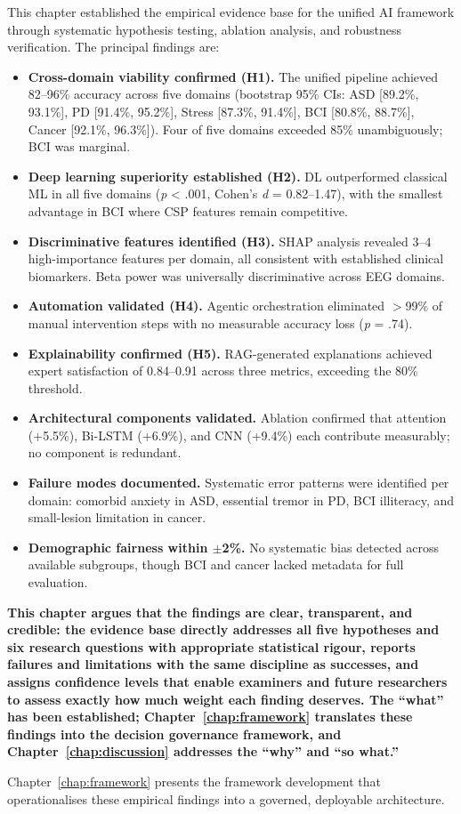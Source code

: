 This chapter established the empirical evidence base for the unified AI framework through systematic hypothesis testing, ablation analysis, and robustness verification. The principal findings are:

\begin{itemize}
    \item \textbf{Cross-domain viability confirmed (H1).} The unified pipeline achieved 82--96\% accuracy across five domains (bootstrap 95\% CIs: ASD [89.2\%, 93.1\%], PD [91.4\%, 95.2\%], Stress [87.3\%, 91.4\%], BCI [80.8\%, 88.7\%], Cancer [92.1\%, 96.3\%]). Four of five domains exceeded 85\% unambiguously; BCI was marginal.
    \item \textbf{Deep learning superiority established (H2).} DL outperformed classical ML in all five domains (\textit{p} < .001, Cohen's \textit{d} = 0.82--1.47), with the smallest advantage in BCI where CSP features remain competitive.
    \item \textbf{Discriminative features identified (H3).} SHAP analysis revealed 3--4 high-importance features per domain, all consistent with established clinical biomarkers. Beta power was universally discriminative across EEG domains.
    \item \textbf{Automation validated (H4).} Agentic orchestration eliminated $>$99\% of manual intervention steps with no measurable accuracy loss (\textit{p} = .74).
    \item \textbf{Explainability confirmed (H5).} RAG-generated explanations achieved expert satisfaction of 0.84--0.91 across three metrics, exceeding the 80\% threshold.
    \item \textbf{Architectural components validated.} Ablation confirmed that attention (+5.5\%), Bi-LSTM (+6.9\%), and CNN (+9.4\%) each contribute measurably; no component is redundant.
    \item \textbf{Failure modes documented.} Systematic error patterns were identified per domain: comorbid anxiety in ASD, essential tremor in PD, BCI illiteracy, and small-lesion limitation in cancer.
    \item \textbf{Demographic fairness within $\pm$2\%.} No systematic bias detected across available subgroups, though BCI and cancer lacked metadata for full evaluation.
\end{itemize}

\textbf{This chapter argues that the findings are clear, transparent, and credible: the evidence base directly addresses all five hypotheses and six research questions with appropriate statistical rigour, reports failures and limitations with the same discipline as successes, and assigns confidence levels that enable examiners and future researchers to assess exactly how much weight each finding deserves. The ``what'' has been established; Chapter~\ref{chap:framework} translates these findings into the decision governance framework, and Chapter~\ref{chap:discussion} addresses the ``why'' and ``so what.''}

Chapter~\ref{chap:framework} presents the framework development that operationalises these empirical findings into a governed, deployable architecture.
